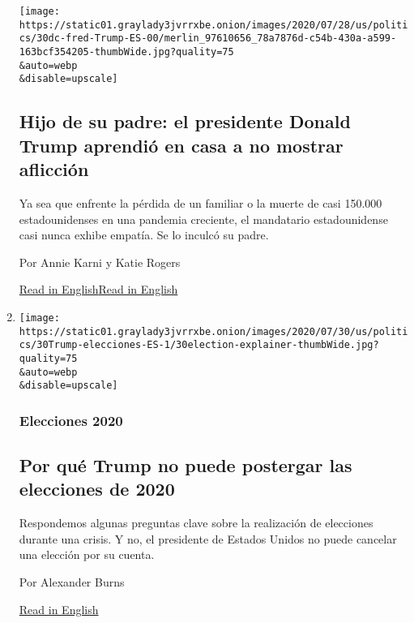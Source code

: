 \begin{enumerate}
  \texttt{[image: https://static01.graylady3jvrrxbe.onion/images/2020/07/28/us/politics/30dc-fred-Trump-ES-00/merlin\_97610656\_78a7876d-c54b-430a-a599-163bcf354205-thumbWide.jpg?quality=75\\\&auto=webp\\\&disable=upscale]}

  \hypertarget{hijo-de-su-padre-el-presidente-donald-trump-aprendiuxf3-en-casa-a-no-mostrar-aflicciuxf3n}{%
  \subsection{Hijo de su padre: el presidente Donald Trump aprendió en
  casa a no mostrar
  aflicción}\label{hijo-de-su-padre-el-presidente-donald-trump-aprendiuxf3-en-casa-a-no-mostrar-aflicciuxf3n}}

  Ya sea que enfrente la pérdida de un familiar o la muerte de casi
  150.000 estadounidenses en una pandemia creciente, el mandatario
  estadounidense casi nunca exhibe empatía. Se lo inculcó su padre.

  Por Annie Karni y Katie Rogers

  \href{https://www.nytimes3xbfgragh.onion/2020/07/28/us/politics/donald-fred-trump.html}{Read
  in
  English}\href{https://www.nytimes3xbfgragh.onion/2020/07/28/us/politics/donald-fred-trump.html}{Read
  in English}
\item
  \href{/es/2020/07/30/espanol/estados-unidos/trump-retrasar-elecciones.html}{}

  \texttt{[image: https://static01.graylady3jvrrxbe.onion/images/2020/07/30/us/politics/30Trump-elecciones-ES-1/30election-explainer-thumbWide.jpg?quality=75\\\&auto=webp\\\&disable=upscale]}

  \hypertarget{elecciones-2020}{%
  \subsubsection{Elecciones 2020}\label{elecciones-2020}}

  \hypertarget{por-quuxe9-trump-no-puede-postergar-las-elecciones-de-2020}{%
  \subsection{Por qué Trump no puede postergar las elecciones de
  2020}\label{por-quuxe9-trump-no-puede-postergar-las-elecciones-de-2020}}

  Respondemos algunas preguntas clave sobre la realización de elecciones
  durante una crisis. Y no, el presidente de Estados Unidos no puede
  cancelar una elección por su cuenta.

  Por Alexander Burns

  \href{https://www.nytimes3xbfgragh.onion/2020/07/30/us/politics/trump-postpone-election.html}{Read
  in English}
\end{enumerate}

